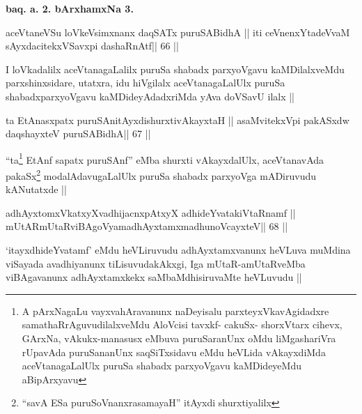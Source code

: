\begin{center}
\textbf{baq. a. 2. bArxhamxNa 3.}
\end{center}

\begin{shl}
aceVtaneVSu loVkeV\s simxnanx daqSATx puruSABidhA ||
iti ceVnenxYtadeVvaM sAyxdacitekxVSavxpi dashaRnAtf\hfill || 66 ||
\end{shl}

\begin{artha}
I loVkadalilx aceVtanagaLalilx puruSa shabadx parxyoVgavu
kaMDilalxveMdu parxshinxsidare, utatxra, idu hiVgilalx
aceVtanagaLalUlx puruSa shabadxparxyoVgavu kaMDideyAdadxriMda yAva
doVSavU ilalx ||
\end{artha}



\begin{shl}
ta EtAnasxpatx puruSAnitAyxdishurxtivAkayxtaH ||
asaMvitekxV\s pi pakASxdw daqshayxteV puruSABidhA\hfill || 67 ||
\end{shl}

\begin{artha}
``ta\footnote{A pArxNagaLu vayxvahAravanunx naDeyisalu
    parxteyxVkavAgidadxre samathaRrAguvudilalxveMdu AloVcisi tavxkf-
    cakuSx- shorxVtarx cihevx, GArxNa, vAkukx-manasusx eMbuva
    puruSaranUnx oMdu liMgashariVra rUpavAda puruSananUnx
    saqSiTxsidavu eMdu heVLida vAkayxdiMda aceVtanagaLalUlx puruSa
    shabadx parxyoVgavu kaMDideyeMdu aBipArxyavu} EtAnf sapatx puruSAnf'' eMba shurxti vAkayxdalUlx,
  aceVtanavAda pakaSx\footnote{``savA ESa puruSoV\s nanxrasamayaH''
    itAyxdi shurxtiyalilx} modalAdavugaLalUlx puruSa shabadx
  parxyoVga mADiruvudu kANutatxde ||
\end{artha}



\begin{shl}
adhAyxtomxVkatxyXvadhijacnxpAtxyX adhideYvatakiVtaRnamf ||
mUtARmUtaRviBAgoV\s yamadhAyxtamxmadhunoVcayxteV\hfill || 68 ||
\end{shl}

\begin{artha}
`itayxdhideYvatamf' eMdu heVLiruvudu adhAyxtamxvanunx heVLuva muMdina
  viSayada avadhiyanunx tiLisuvudakAkxgi, Iga mUtaR-amUtaRveMba
  viBAgavanunx adhAyxtamxkekx saMbaMdhisiruvaMte heVLuvudu ||
\end{artha}

\medskip

